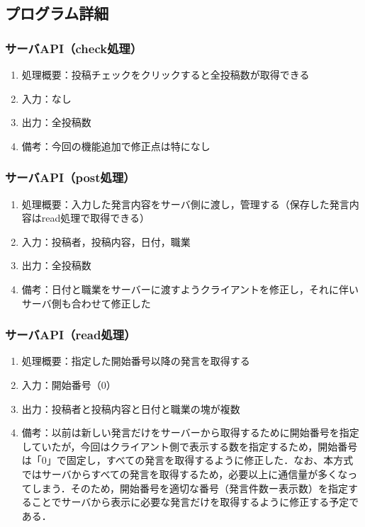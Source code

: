 \documentclass[uplatex,dvipdfmx]{jsarticle}
\begin{document}
\subsection{プログラム詳細}
\subsubsection{サーバAPI（check処理）}

\begin{enumerate}
	\item 処理概要：投稿チェックをクリックすると全投稿数が取得できる
	\item 入力：なし
	\item 出力：全投稿数
	\item 備考：今回の機能追加で修正点は特になし
\end{enumerate}

\subsubsection{サーバAPI（post処理）}

\begin{enumerate}
	\item 処理概要：入力した発言内容をサーバ側に渡し，管理する（保存した発言内容はread処理で取得できる）
	\item 入力：投稿者，投稿内容，日付，職業
	\item 出力：全投稿数
	\item 備考：日付と職業をサーバーに渡すようクライアントを修正し，それに伴いサーバ側も合わせて修正した
\end{enumerate}

\subsubsection{サーバAPI（read処理）}

\begin{enumerate}
	\item 処理概要：指定した開始番号以降の発言を取得する
	\item 入力：開始番号（0）
	\item 出力：投稿者と投稿内容と日付と職業の塊が複数
	\item 備考：以前は新しい発言だけをサーバーから取得するために開始番号を指定していたが，今回はクライアント側で表示する数を指定するため，開始番号は「0」で固定し，すべての発言を取得するように修正した．なお、本方式ではサーバからすべての発言を取得するため，必要以上に通信量が多くなってしまう．そのため，開始番号を適切な番号（発言件数ー表示数）を指定することでサーバから表示に必要な発言だけを取得するように修正する予定である．
\end{enumerate}
\end{document}
